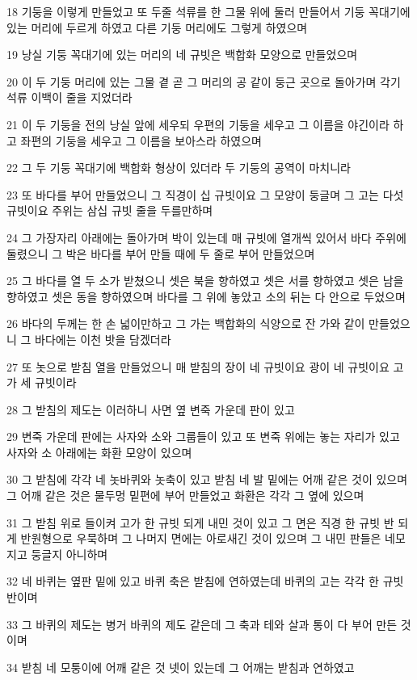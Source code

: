 \par 18 기둥을 이렇게 만들었고 또 두줄 석류를 한 그물 위에 둘러 만들어서 기둥 꼭대기에 있는 머리에 두르게 하였고 다른 기둥 머리에도 그렇게 하였으며
\par 19 낭실 기둥 꼭대기에 있는 머리의 네 규빗은 백합화 모양으로 만들었으며
\par 20 이 두 기둥 머리에 있는 그물 곁 곧 그 머리의 공 같이 둥근 곳으로 돌아가며 각기 석류 이백이 줄을 지었더라
\par 21 이 두 기둥을 전의 낭실 앞에 세우되 우편의 기둥을 세우고 그 이름을 야긴이라 하고 좌편의 기둥을 세우고 그 이름을 보아스라 하였으며
\par 22 그 두 기둥 꼭대기에 백합화 형상이 있더라 두 기둥의 공역이 마치니라
\par 23 또 바다를 부어 만들었으니 그 직경이 십 규빗이요 그 모양이 둥글며 그 고는 다섯 규빗이요 주위는 삼십 규빗 줄을 두를만하며
\par 24 그 가장자리 아래에는 돌아가며 박이 있는데 매 규빗에 열개씩 있어서 바다 주위에 둘렸으니 그 박은 바다를 부어 만들 때에 두 줄로 부어 만들었으며
\par 25 그 바다를 열 두 소가 받쳤으니 셋은 북을 향하였고 셋은 서를 향하였고 셋은 남을 향하였고 셋은 동을 향하였으며 바다를 그 위에 놓았고 소의 뒤는 다 안으로 두었으며
\par 26 바다의 두께는 한 손 넓이만하고 그 가는 백합화의 식양으로 잔 가와 같이 만들었으니 그 바다에는 이천 밧을 담겠더라
\par 27 또 놋으로 받침 열을 만들었으니 매 받침의 장이 네 규빗이요 광이 네 규빗이요 고가 세 규빗이라
\par 28 그 받침의 제도는 이러하니 사면 옆 변죽 가운데 판이 있고
\par 29 변죽 가운데 판에는 사자와 소와 그룹들이 있고 또 변죽 위에는 놓는 자리가 있고 사자와 소 아래에는 화환 모양이 있으며
\par 30 그 받침에 각각 네 놋바퀴와 놋축이 있고 받침 네 발 밑에는 어깨 같은 것이 있으며 그 어깨 같은 것은 물두멍 밑편에 부어 만들었고 화환은 각각 그 옆에 있으며
\par 31 그 받침 위로 들이켜 고가 한 규빗 되게 내민 것이 있고 그 면은 직경 한 규빗 반 되게 반원형으로 우묵하며 그 나머지 면에는 아로새긴 것이 있으며 그 내민 판들은 네모지고 둥글지 아니하며
\par 32 네 바퀴는 옆판 밑에 있고 바퀴 축은 받침에 연하였는데 바퀴의 고는 각각 한 규빗 반이며
\par 33 그 바퀴의 제도는 병거 바퀴의 제도 같은데 그 축과 테와 살과 통이 다 부어 만든 것이며
\par 34 받침 네 모퉁이에 어깨 같은 것 넷이 있는데 그 어깨는 받침과 연하였고
